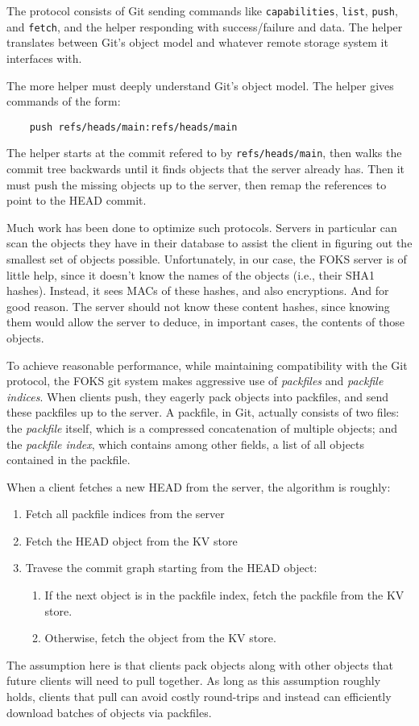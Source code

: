 The protocol consists of Git sending commands like \texttt{capabilities},
\texttt{list}, \texttt{push}, and \texttt{fetch}, and the helper responding
with success/failure and data. The helper translates between
Git's object model and whatever remote storage system it interfaces with.

The more helper must deeply understand Git's object model. The 
helper gives commands of the form:
%
\begin{verbatim}
    push refs/heads/main:refs/heads/main
\end{verbatim}
%
The helper starts at the commit refered to by \texttt{refs/heads/main},
then walks the commit tree backwards until it finds objects that the
server already has. Then it must push the missing objects up to the server,
then remap the references to point to the HEAD commit.

Much work has been done to optimize such protocols. Servers in particular
can scan the objects they have in their database to assist the client
in figuring out the smallest set of objects possible. Unfortunately,
in our case, the FOKS server is of little help, since it doesn't
know the names of the objects (i.e., their SHA1 hashes). Instead, it
sees MACs of these hashes, and also encryptions. And for good reason.
The server should not know these content hashes, since knowing them
would allow the server to deduce, in important cases, the contents
of those objects. 

To achieve reasonable performance, while maintaining compatibility
with the Git protocol, the FOKS git system makes aggressive use
of \textit{packfiles} and \textit{packfile indices}. When
clients push, they eagerly pack objects into packfiles, 
and send these packfiles up to the server. A packfile, in Git, 
actually consists of two files: the \textit{packfile} itself,
which is a compressed concatenation of multiple objects; and
the \textit{packfile index}, which contains among other fields,
a list of all objects contained in the packfile. 

When a client fetches a new HEAD from the server, the algorithm is roughly:
%
\begin{enumerate}[itemsep=2pt,parsep=0pt]
    \item Fetch all packfile indices from the server
    \item Fetch the HEAD object from the KV store
    \item Travese the commit graph starting from the HEAD object:
    \begin{enumerate}[itemsep=2pt,parsep=0pt]
        \item If the next object is in the packfile index, fetch
             the packfile from the KV store.
        \item Otherwise, fetch the object from the KV store.
    \end{enumerate}
\end{enumerate}
%
The assumption here is that clients pack objects along with other
objects that future clients will need to pull together. As long
as this assumption roughly holds, clients that pull can avoid
costly round-trips and instead can efficiently download batches of objects
via packfiles.

